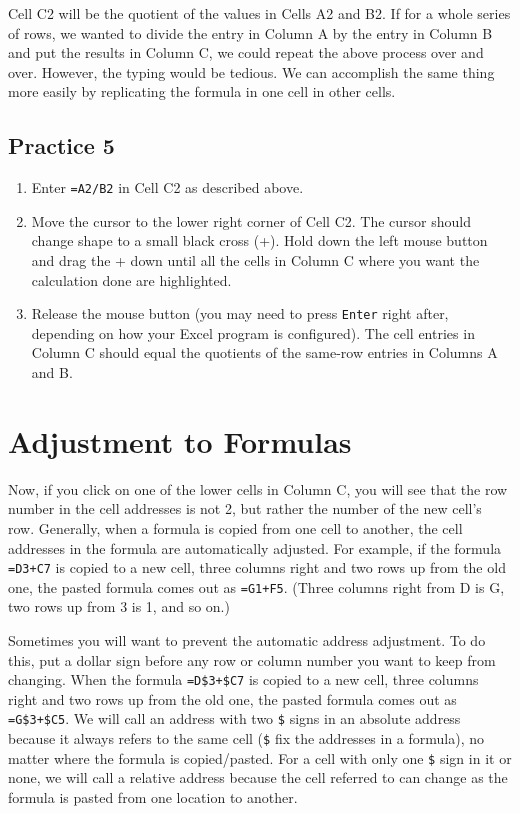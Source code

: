 \documentclass[
  12pt,
  letterpaper,
]{book}
\providecommand{\tightlist}{%
  \setlength{\itemsep}{0pt}\setlength{\parskip}{0pt}}
\begin{document}
Cell C2 will be the quotient of the values in Cells A2 and B2.
If for a whole series of rows, we wanted to divide the entry in Column A by the entry in Column B and put the results in Column C, we could repeat the above process over and over. However, the typing would be tedious. We can accomplish the same thing more easily by replicating the formula in one cell in other cells.

\hypertarget{practice-5}{%
\subsection{Practice 5}\label{practice-5}}

\begin{enumerate}
\def\labelenumi{\arabic{enumi}.}
\tightlist
\item
  Enter \texttt{=A2/B2} in Cell C2 as described above.
\item
  Move the cursor to the lower right corner of Cell C2. The cursor should change shape to a small black cross (+). Hold down the left mouse button and drag the + down until all the cells in Column C where you want the calculation done are highlighted.
\item
  Release the mouse button (you may need to press \texttt{Enter} right after, depending on how your Excel program is configured). The cell entries in Column C should equal the quotients of the same-row entries in Columns A and B.
\end{enumerate}

\hypertarget{adjustment-to-formulas}{%
\section{Adjustment to Formulas}\label{adjustment-to-formulas}}

Now, if you click on one of the lower cells in Column C, you will see that the row number in the cell addresses is not 2, but rather the number of the new cell's row. Generally, when a formula is copied from one cell to another, the cell addresses in the formula are automatically adjusted. For example, if the formula \texttt{=D3+C7} is copied to a new cell, three columns right and two rows up from the old one, the pasted formula comes out as \texttt{=G1+F5}. (Three columns right from D is G, two rows up from 3 is 1, and so on.)

Sometimes you will want to prevent the automatic address adjustment. To do this, put a dollar sign before any row or column number you want to keep from changing. When the formula \texttt{=D\$3+\$C7} is copied to a new cell, three columns right and two rows up from the old one, the pasted formula comes out as \texttt{=G\$3+\$C5}. We will call an address with two \texttt{\$} signs in an absolute address because it always refers to the same cell (\texttt{\$} fix the addresses in a formula), no matter where the formula is copied/pasted. For a cell with only one \texttt{\$} sign in it or none, we will call a relative address because the cell referred to can change as the formula is pasted from one location to another.
\end{document}

